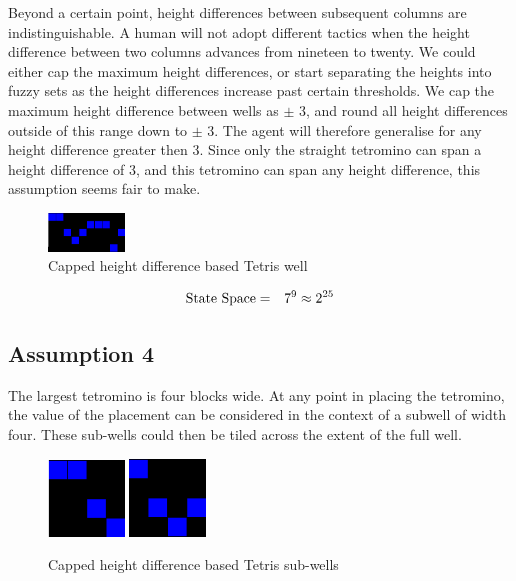 \documentclass{rucsthesis}
\begin{document}
Beyond a certain point, height differences between subsequent columns are indistinguishable. A human will not adopt different tactics when the height difference between two columns advances from nineteen to twenty. We could either cap the maximum height differences, or start separating the heights into fuzzy sets as the height differences increase past certain thresholds. We cap the maximum height difference between wells as $\pm$ 3, and round all height differences outside of this range down to $\pm$ 3. The agent will therefore generalise for any height difference greater then 3. Since only the straight tetromino can span a height difference of 3, and this tetromino can span any height difference, this assumption seems fair to make. 

\begin{figure}[h]
\centering
\includegraphics[width=0.8in]{capdiffheightwell.png}
\caption{Capped height difference based Tetris well}
\label{fig:capdiffheightwell}
\end{figure}

\begin{eqnarray}
\centering
\textrm{State Space} & = & 7^{9} \approx 2^{25}
\end{eqnarray}

\subsection*{Assumption 4}

The largest tetromino is four blocks wide. At any point in placing the tetromino, the value of the placement can be considered in the context of a subwell of width four. These sub-wells could then be tiled across the extent of the full well.

\begin{figure}[h]
\centering
\includegraphics[width=0.8in]{reducedwell.png}
\includegraphics[width=0.8in]{reducedwell2.png}
\caption{Capped height difference based Tetris sub-wells}
\label{fig:redwell}
\end{figure}
\end{document}
